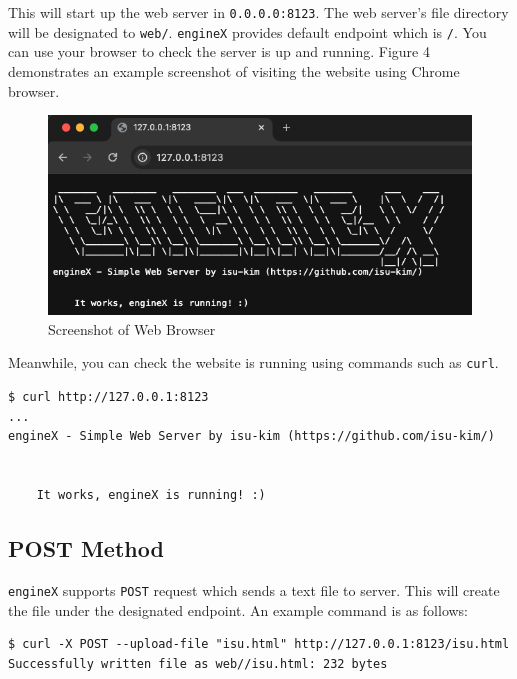 \documentclass{homework}
\begin{document}
This will start up the web server in \texttt{0.0.0.0:8123}. The web server's file directory will be designated to \texttt{web/}. \texttt{engineX} provides default endpoint which is \texttt{/}. You can use your browser to check the server is up and running. Figure 4 demonstrates an example screenshot of visiting the website using Chrome browser.

\begin{figure}[h]
\begin{center}
\includegraphics[scale=0.6]{4_ss1.png}    
\caption{Screenshot of Web Browser}
\end{center}
\end{figure}

Meanwhile, you can check the website is running using commands such as \texttt{curl}.
\\
\begin{center}
\begin{code}
\begin{verbatim}
$ curl http://127.0.0.1:8123
...
engineX - Simple Web Server by isu-kim (https://github.com/isu-kim/)


    It works, engineX is running! :)        
\end{verbatim}
\end{code}
\end{center}
\pagebreak

\subsection{POST Method}
\texttt{engineX} supports \texttt{POST} request which sends a text file to server. This will create the file under the designated endpoint. An example command is as follows:
\\
\begin{center}
\begin{code}
\begin{verbatim}
$ curl -X POST --upload-file "isu.html" http://127.0.0.1:8123/isu.html
Successfully written file as web//isu.html: 232 bytes
\end{verbatim}
\end{code}
\end{center}
\end{document}
